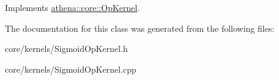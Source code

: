 Implements \mbox{\hyperlink{classathena_1_1core_1_1_op_kernel_a762e541463ffd089b47a8e6755c30fe1}{athena\+::core\+::\+Op\+Kernel}}.



The documentation for this class was generated from the following files\+:\begin{DoxyCompactItemize}
\item 
core/kernels/Sigmoid\+Op\+Kernel.\+h\item 
core/kernels/Sigmoid\+Op\+Kernel.\+cpp\end{DoxyCompactItemize}
